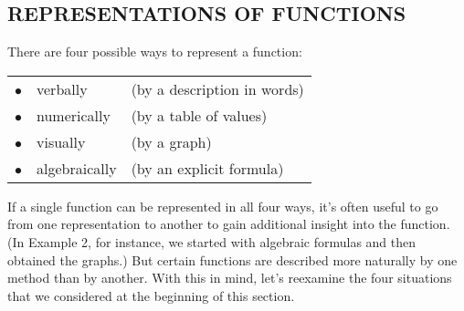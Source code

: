 \documentclass{sebase}
\begin{document}
\subsection{REPRESENTATIONS OF FUNCTIONS}

There are four possible ways to represent a function:\medskip

\begin{tabular}{ll}
$\bullet \quad $verbally & (by a description in words) \\ 
$\bullet \quad $numerically & (by a table of values) \\ 
$\bullet \quad $visually & (by a graph) \\ 
$\bullet \quad $algebraically & (by an explicit formula)%
\end{tabular}%
\medskip

If a single function can be represented in all four ways, it's often useful
to go from one representation to another to gain additional insight into the
function. (In Example 2, for instance, we started with algebraic formulas
and then obtained the graphs.) But certain functions are described more
naturally by one method than by another. With this in mind, let's reexamine
the four situations that we considered at the beginning of this section.
\end{document}
